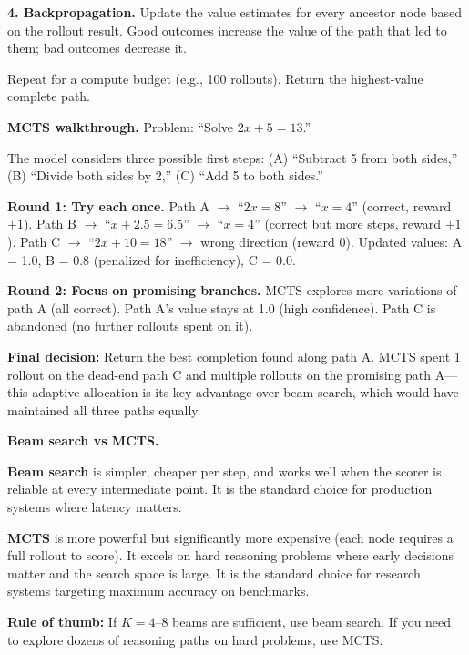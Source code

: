 \begin{chapterenv}
\begin{infobox}
\textbf{4. Backpropagation.} Update the value estimates for every ancestor node based on the rollout result. Good outcomes increase the value of the path that led to them; bad outcomes decrease it.

Repeat for a compute budget (e.g., 100 rollouts). Return the highest-value complete path.
\end{infobox}

\textbf{MCTS walkthrough.} Problem: ``Solve $2x + 5 = 13$.''

The model considers three possible first steps: (A) ``Subtract 5 from both sides,'' (B) ``Divide both sides by 2,'' (C) ``Add 5 to both sides.''

\textbf{Round 1: Try each once.} Path A $\to$ ``$2x = 8$'' $\to$ ``$x = 4$'' (correct, reward $+1$). Path B $\to$ ``$x + 2.5 = 6.5$'' $\to$ ``$x = 4$'' (correct but more steps, reward $+1$). Path C $\to$ ``$2x + 10 = 18$'' $\to$ wrong direction (reward $0$). Updated values: A = 1.0, B = 0.8 (penalized for inefficiency), C = 0.0.

\textbf{Round 2: Focus on promising branches.} MCTS explores more variations of path A (all correct). Path A's value stays at 1.0 (high confidence). Path C is abandoned (no further rollouts spent on it).

\textbf{Final decision:} Return the best completion found along path A. MCTS spent 1 rollout on the dead-end path C and multiple rollouts on the promising path A---this adaptive allocation is its key advantage over beam search, which would have maintained all three paths equally.

\begin{tipbox}
\textbf{Beam search vs MCTS.}

\textbf{Beam search} is simpler, cheaper per step, and works well when the scorer is reliable at every intermediate point. It is the standard choice for production systems where latency matters.

\textbf{MCTS} is more powerful but significantly more expensive (each node requires a full rollout to score). It excels on hard reasoning problems where early decisions matter and the search space is large. It is the standard choice for research systems targeting maximum accuracy on benchmarks.

\textbf{Rule of thumb:} If $K = 4$--$8$ beams are sufficient, use beam search. If you need to explore dozens of reasoning paths on hard problems, use MCTS.
\end{tipbox}


\end{chapterenv}

